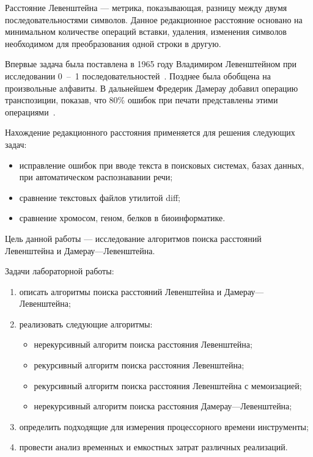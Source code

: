 
Расстояние Левенштейна --- метрика, показывающая, разницу между двумя последовательностями символов. Данное редакционное расстояние основано на минимальном количестве операций вставки, удаления, изменения символов необходимом для преобразования одной строки в другую.

Впервые задача была поставлена в 1965 году Владимиром Левенштейном при исследовании 0~--~1 последовательностей~\cite{levenstein65}. Позднее была обобщена на произвольные алфавиты. В дальнейшем Фредерик Дамерау добавил операцию транспозиции, показав, что 80\% ошибок при печати представлены этими операциями~\cite{damerau64}.

Нахождение редакционного расстояния применяется для решения следующих задач:
\begin{itemize}[label=---]
	\item исправление ошибок при вводе текста в поисковых системах, базах данных, при автоматическом распознавании речи;
	\item сравнение текстовых файлов утилитой diff;
	\item сравнение хромосом, геном, белков в биоинформатике.
\end{itemize}

Цель данной работы --- исследование алгоритмов поиска расстояний Левенштейна и Дамерау---Левенштейна. 

Задачи лабораторной работы:
\begin{enumerate}[label={\arabic*)}]
	\item описать алгоритмы поиска расстояний Левенштейна и Дамерау---Левенштейна;
	\item реализовать следующие алгоритмы:
	\begin{itemize}[label=---]
		\item нерекурсивный алгоритм поиска расстояния Левенштейна;
		\item рекурсивный алгоритм поиска расстояния Левенштейна;
		\item рекурсивный алгоритм поиска расстояния Левенштейна с мемоизацией;
		\item нерекурсивный алгоритм поиска расстояния Дамерау---Левенштейна;
	\end{itemize}
	\item определить подходящие для измерения процессорного времени инструменты;
	\item провести анализ временных и емкостных затрат различных реализаций.
\end{enumerate}
\clearpage